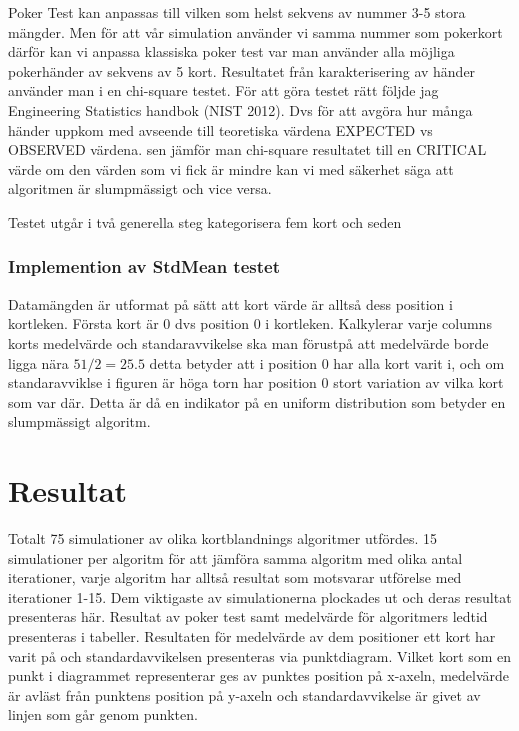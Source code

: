 \documentclass[swedish,a4paper]{article}
\begin{document}
Poker Test kan anpassas till vilken som helst sekvens av nummer 3-5 stora
mängder. Men för att vår simulation använder vi samma nummer som pokerkort
därför kan vi anpassa klassiska poker test var man använder alla möjliga
pokerhänder av sekvens av 5 kort. Resultatet från karakterisering av händer
använder man i en chi-square testet. För att göra testet rätt följde jag
Engineering Statistics handbok (NIST 2012). Dvs för att avgöra hur många 
händer
uppkom med avseende till teoretiska värdena EXPECTED vs OBSERVED värdena. sen
jämför man chi-square resultatet till en CRITICAL värde om den värden som vi
fick är mindre kan vi med säkerhet säga att algoritmen är slumpmässigt och 
vice versa.

Testet utgår i två generella steg kategorisera fem kort och seden 

\subsubsection{Implemention av StdMean testet}
Datamängden är utformat på sätt att kort värde är alltså dess position i
kortleken. Första kort är 0 dvs position 0 i kortleken. Kalkylerar varje
columns korts medelvärde och standaravvikelse ska man förustpå att medelvärde
borde ligga nära $51/2= 25.5$ detta betyder att i position 0 har alla kort varit
i, och om standaravviklse i figuren är höga torn har position 0 stort variation
av vilka kort som var där. Detta är då en indikator på en uniform distribution
som betyder en slumpmässigt algoritm.

\section{Resultat}

Totalt 75 simulationer av olika kortblandnings algoritmer utfördes. 15 simulationer per algoritm för att jämföra samma algoritm med olika antal iterationer, varje algoritm har alltså resultat som motsvarar utförelse med iterationer 1-15. Dem viktigaste av simulationerna plockades ut och deras resultat presenteras här. Resultat av poker test samt medelvärde för algoritmers ledtid presenteras i tabeller. Resultaten för medelvärde av dem positioner ett kort har varit på och standardavvikelsen presenteras via punktdiagram. Vilket kort som en punkt i diagrammet representerar ges av punktes position på x-axeln, medelvärde är avläst från punktens position på y-axeln och standardavvikelse är givet av linjen som går genom punkten. 
\end{document}
